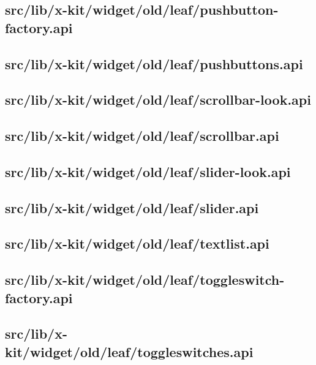 \subsection{src/lib/x-kit/widget/old/leaf/pushbutton-factory.api}


\subsection{src/lib/x-kit/widget/old/leaf/pushbuttons.api}


\subsection{src/lib/x-kit/widget/old/leaf/scrollbar-look.api}


\subsection{src/lib/x-kit/widget/old/leaf/scrollbar.api}


\subsection{src/lib/x-kit/widget/old/leaf/slider-look.api}


\subsection{src/lib/x-kit/widget/old/leaf/slider.api}


\subsection{src/lib/x-kit/widget/old/leaf/textlist.api}


\subsection{src/lib/x-kit/widget/old/leaf/toggleswitch-factory.api}


\subsection{src/lib/x-kit/widget/old/leaf/toggleswitches.api}


